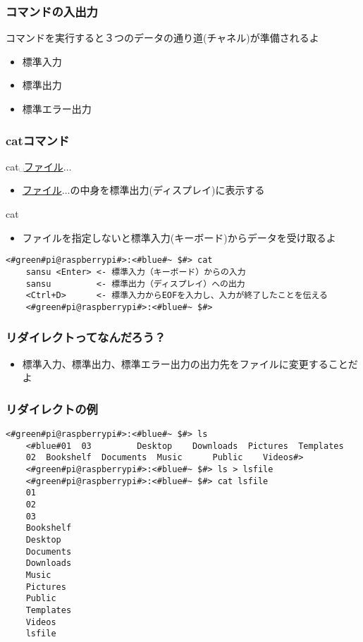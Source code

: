 \begin{frame}
    \frametitle{コマンドの入出力}
    コマンドを実行すると３つのデータの通り道(チャネル)が準備されるよ
    \begin{itemize}
        \item 標準入力
        \item 標準出力
        \item 標準エラー出力
    \end{itemize}
    \begin{figure}[h]
        \centering
        
    \end{figure}
\end{frame}

\begin{frame}[fragile]
    \frametitle{catコマンド}
    cat␣\underline{ファイル}$\ldots$
    \begin{itemize}
        \item \underline{ファイル}$\ldots$の中身を標準出力(ディスプレイ)に表示する
    \end{itemize}
    cat
    \begin{itemize}
        \item ファイルを指定しないと標準入力(キーボード)からデータを受け取るよ
    \end{itemize}
    \begin{lstlisting}[title=catの標準入力・標準出力, label=stdioCat]
    <#green#pi@raspberrypi#>:<#blue#~ $#> cat 
    sansu <Enter> <- 標準入力（キーボード）からの入力
    sansu         <- 標準出力（ディスプレイ）への出力
    <Ctrl+D>      <- 標準入力からEOFを入力し、入力が終了したことを伝える
    <#green#pi@raspberrypi#>:<#blue#~ $#>
    \end{lstlisting}
\end{frame}

\begin{frame}
    \frametitle{リダイレクトってなんだろう？}
    \begin{itemize}
        \item 標準入力、標準出力、標準エラー出力の出力先をファイルに変更することだよ
    \end{itemize}
    \begin{figure}
        \centering
        
    \end{figure}
\end{frame}

\begin{frame}[fragile]
    \frametitle{リダイレクトの例}
    \begin{lstlisting}[title=lsの出力をリダイレクトする, label=redirectLs]
    <#green#pi@raspberrypi#>:<#blue#~ $#> ls 
    <#blue#01  03         Desktop    Downloads  Pictures  Templates
    02  Bookshelf  Documents  Music      Public    Videos#>
    <#green#pi@raspberrypi#>:<#blue#~ $#> ls > lsfile
    <#green#pi@raspberrypi#>:<#blue#~ $#> cat lsfile
    01
    02
    03
    Bookshelf
    Desktop
    Documents
    Downloads
    Music
    Pictures
    Public
    Templates
    Videos
    lsfile
    \end{lstlisting}
\end{frame}

